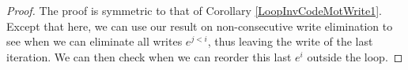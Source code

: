 \begin{proof}

    The proof is symmetric to that of Corollary \ref{LoopInvCodeMotWrite1}. 
    Except that here, we can use our result on non-consecutive write elimination to see when we can eliminate all writes $e^{j<i}$, thus leaving the write of the last iteration.
    We can then check when we can reorder this last $e^i$ outside the loop.  
%
%
%

\end{proof}
